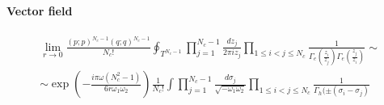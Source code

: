 \begin{appendices}
\begin{comment}
\paragraph{Vector field}
\begin{multline}
 \prod_{1 \leq i <j \leq N_c} 
  \Gamma_e\left(  {z_i \over z_j} \right)\Gamma_e\left(  {z_j \over z_i} \right) 
  \sim  \\
 \sim  \prod_{1 \leq i <j \leq N_c} 
 \exp{\left( - \frac{i \pi} {6 r \omega_1 \omega_2 }  ( (\sigma_j - \sigma_i) + (\sigma_i- \sigma_j) - 2 \omega) \right) } \, \, \Gamma_h (  \sigma_i - \sigma_j) \Gamma_h (  \sigma_j - \sigma_i) =\\
= \exp \bigg( {- \frac{i \pi} {6 r \omega_1 \omega_2 }  ( - N_c(N_c -1) \, \omega)}  \bigg)   \prod_{1 \leq i <j \leq N_c} 
 \, \Gamma_h ( \pm ( \sigma_i - \sigma_j)) 
\end{multline}

\end{comment}
\paragraph{Vector field}
\begin{multline}
\lim_{r \rightarrow 0} \frac{ (p;p)^{N_c- 1}(q;q)^{N_c- 1} }{ N_c ! }
\oint_{T^{N_c -1}} \prod_{j=1}^{N_c -1 } \frac{ d z_j}{2 \pi i z_j} \prod_{1 \leq i<j \leq N_c } \frac{1}{\Gamma_e( \frac{z_i}{z_j} )\Gamma_e( \frac{z_j}{z_i} )} \sim
\\
\sim 
\exp \left(  
- \frac{ i \pi \omega (N_c^2 -1)}{6 r \omega_1 \omega_2}
\right)
 \frac{1}{N_c !} \int \prod_{j=1}^{N_c -1 } \frac{d \sigma_j}{\sqrt{- \omega_1 \omega_2} } \prod_{1 \leq i<j \leq N_c }\frac{1}{\Gamma_h( \pm (\sigma_i - \sigma_j) }
\end{multline}



\end{appendices}
